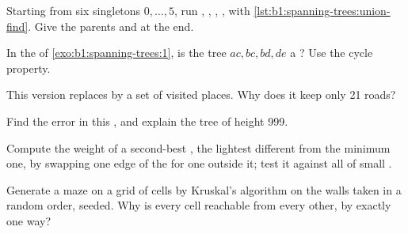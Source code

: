 \begin{exercise}[$\star$]\label{exo:b1:spanning-trees:3}
Starting from six singletons $0, \dots, 5$, run , , ,
,  with \cref{lst:b1:spanning-trees:union-find}. Give the parents and  at the
end.
\end{exercise}

\begin{exercise}[$\star$]\label{exo:b1:spanning-trees:4}
In the  of \cref{exo:b1:spanning-trees:1}, is the tree $ac, bc, bd, de$ a ? Use the cycle
property.
\end{exercise}

\begin{exercise}[$\star\star$]\label{exo:b1:spanning-trees:5}
This version replaces  by a set of visited places. Why does it keep only 21 roads?
\end{exercise}

\begin{exercise}[$\star\star$]\label{exo:b1:spanning-trees:6}
Find the error in this , and explain the tree of height 999.
\end{exercise}

\begin{exercise}[$\star\star$]\label{exo:b1:spanning-trees:7}
Compute the weight of a second-best , the lightest  different from the minimum one, by
swapping one edge of the  for one outside it; test it against all  of small
.
\end{exercise}

\begin{exercise}[$\star\star$]\label{exo:b1:spanning-trees:8}
Generate a maze on a grid of cells by Kruskal's algorithm on the walls taken in a random order, seeded. Why is every
cell reachable from every other, by exactly one way?
\end{exercise}

